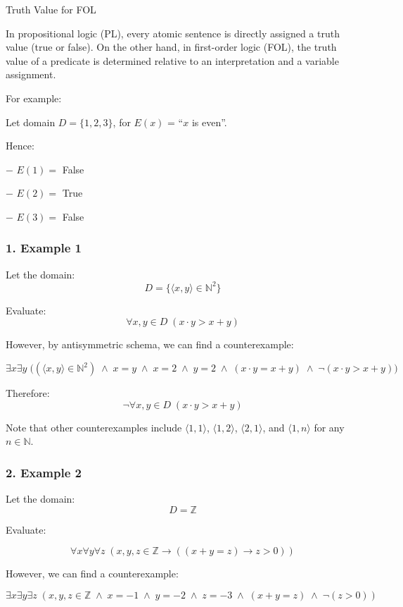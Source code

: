 Truth Value for FOL

In propositional logic (PL), every atomic sentence is directly assigned
a truth value (true or false). On the other hand, in first-order logic
(FOL), the truth value of a predicate is determined relative to an
interpretation and a variable assignment.

For example:

Let domain \(D = \{1,2,3\}\), for \(E(x)\) = ``\(x\) is even''.

Hence:

− \(E(1) =\) False

− \(E(2) =\) True

− \(E(3) =\) False

\subsubsection{1. Example 1}\label{example-1}

Let the domain: \[D = \{\langle x,y \rangle \in \mathbb{N}^2\}\]

Evaluate: \[\forall x,y  \in D \;(x \cdot y > x + y)\]

However, by antisymmetric schema, we can find a counterexample:

\[
\exists x \exists y \;\big((\langle x, y \rangle \in \mathbb{N}^2) \;\land\; x = y \;\land\; x = 2 \;\land\; y = 2 \;\land\; (x \cdot y = x + y) \;\land\; \neg(x \cdot y > x + y)\big)
\]

Therefore: \[\boxed{\neg \forall x,y \in D \;(x \cdot y > x + y)}\]

Note that other counterexamples include \(\langle 1,1 \rangle\),
\(\langle 1,2 \rangle\), \(\langle 2,1 \rangle\), and
\(\langle 1,n \rangle\) for any \(n \in \mathbb{N}\).

\subsubsection{2. Example 2}\label{example-2}

Let the domain: \[D = \mathbb{Z}\]

Evaluate:

\[\forall x \forall y \forall z \;(x, y, z \in \mathbb{Z} \to ((x + y = z) \to z > 0))\]

However, we can find a counterexample:

\[\exists x \exists y \exists z \;(x, y, z \in \mathbb{Z} \;\land\; x = -1 \;\land\; y = -2 \;\land\; z = -3 \;\land\; (x + y = z) \;\land\; \neg(z > 0))\]

